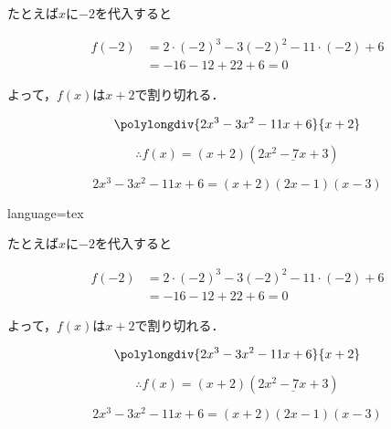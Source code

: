 \documentclass[../main]{subfiles}
\begin{document}
\begin{BracketBox}


	たとえば$x$に$-2$を代入すると

    \begin{align}
        f(-2) &= 2\cdot (-2)^3 - 3(-2)^2 - 11\cdot (-2)+6 \\
              &= -16-12+22+6 = 0
    \end{align}

    よって，$f(x)$は$x+2$で割り切れる．

    \begin{equation}
        \polylongdiv{2x^3-3x^2-11x+6}{x+2}
    \end{equation}

    \begin{equation}
        \therefore f(x) = (x+2)(\underline{2x^2-7x+3})
    \end{equation}

    \begin{equation}
        2x^3-3x^2-11x+6 = (x+2)(2x-1)(x-3)
    \end{equation}

\end{BracketBox}
\begin{Code}{language=tex}
\begin{BracketBox}


	たとえば$x$に$-2$を代入すると

    \begin{align}
        f(-2) &= 2\cdot (-2)^3 - 3(-2)^2 - 11\cdot (-2)+6 \\
                &= -16-12+22+6 = 0
    \end{align}

    よって，$f(x)$は$x+2$で割り切れる．

    \begin{equation}
        \polylongdiv{2x^3-3x^2-11x+6}{x+2}
    \end{equation}

    \begin{equation}
        \therefore f(x) = (x+2)(\underline{2x^2-7x+3})
    \end{equation}

    \begin{equation}
        2x^3-3x^2-11x+6 = (x+2)(2x-1)(x-3)
    \end{equation}

\end{BracketBox}
\end{Code}
\end{document}
